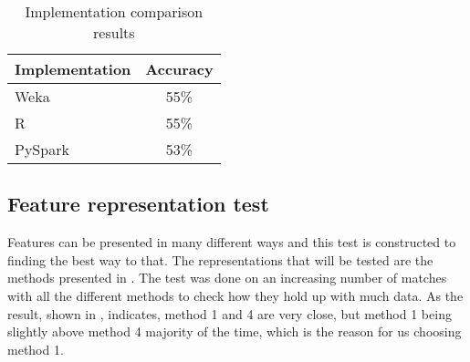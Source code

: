 \begin{table}[!htb]
  \centering
  \begin{tabular}{|l|c|}
    \hline
    Implementation  & Accuracy  \\
    \hline
    Weka & 55\%  \\
    R & 55\%\\
    PySpark & 53\%\\ 
    \hline
  \end{tabular}
  \caption{Implementation comparison results}
  \label{tab:impl_results}
\end{table}

\subsection{Feature representation test}
Features can be presented in many different ways and this test is constructed to finding the best way to that. The representations that will be tested are the methods presented in . The test was done on an increasing number of matches with all the different methods to check how they hold up with much data. As the result, shown in , indicates, method 1 and 4 are very close, but method 1 being slightly above method 4 majority of the time, which is the reason for us choosing method 1.

